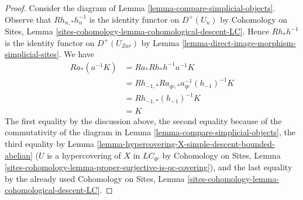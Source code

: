 \documentclass{stacks-project}
\theoremstyle{plain}
\theoremstyle{definition}
\theoremstyle{remark}
\numberwithin{equation}{subsection}
\begin{document}
\begin{proof}
Consider the diagram of Lemma \ref{lemma-compare-simplicial-objects}.
Observe that $Rh_{n, *}h_n^{-1}$ is the identity functor
on $D^+(U_n)$ by Cohomology on Sites, Lemma
\ref{sites-cohomology-lemma-cohomological-descent-LC}.
Hence $Rh_*h^{-1}$ is the identity functor on
$D^+(U_{Zar})$ by
Lemma \ref{lemma-direct-image-morphism-simplicial-sites}.
We have
\begin{align*}
Ra_*(a^{-1}K)
& =
Ra_*Rh_*h^{-1}a^{-1}K \\
& =
Rh_{-1, *}Ra_{qc, *}a_{qc}^{-1}(h_{-1})^{-1}K \\
& =
Rh_{-1, *}(h_{-1})^{-1}K \\
& =
K
\end{align*}
The first equality by the discussion above, the second equality
because of the commutativity of the diagram in
Lemma \ref{lemma-compare-simplicial-objects}, the third equality by
Lemma \ref{lemma-hypercovering-X-simple-descent-bounded-abelian}
($U$ is a hypercovering of $X$ in $\textit{LC}_{qc}$ by
Cohomology on Sites, Lemma
\ref{sites-cohomology-lemma-proper-surjective-is-qc-covering}),
and the last equality by the already used Cohomology on Sites, Lemma
\ref{sites-cohomology-lemma-cohomological-descent-LC}.
\end{proof}
\end{document}

